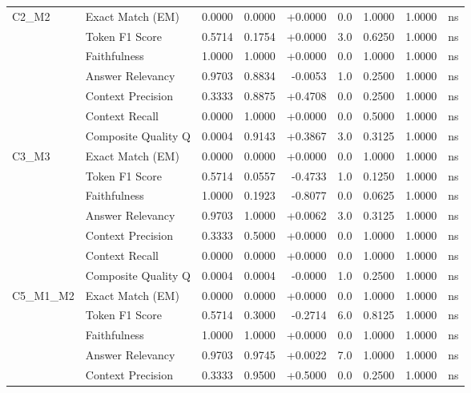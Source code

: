 \begin{table}[p]
\begin{tabular*}{\textwidth}{@{\extracolsep{\fill}} l l r r r r r r c @{}}
\addlinespace
C2\_M2          & Exact Match (EM)     & 0.0000 & 0.0000 & +0.0000 & 0.0 & 1.0000 & 1.0000 & ns \\
                & Token F1 Score       & 0.5714 & 0.1754 & +0.0000 & 3.0 & 0.6250 & 1.0000 & ns \\
                & Faithfulness         & 1.0000 & 1.0000 & +0.0000 & 0.0 & 1.0000 & 1.0000 & ns \\
                & Answer Relevancy     & 0.9703 & 0.8834 & -0.0053 & 1.0 & 0.2500 & 1.0000 & ns \\
                & Context Precision    & 0.3333 & 0.8875 & +0.4708 & 0.0 & 0.2500 & 1.0000 & ns \\
                & Context Recall       & 0.0000 & 1.0000 & +0.0000 & 0.0 & 0.5000 & 1.0000 & ns \\
                & Composite Quality Q  & 0.0004 & 0.9143 & +0.3867 & 3.0 & 0.3125 & 1.0000 & ns \\
\addlinespace
C3\_M3          & Exact Match (EM)     & 0.0000 & 0.0000 & +0.0000 & 0.0 & 1.0000 & 1.0000 & ns \\
                & Token F1 Score       & 0.5714 & 0.0557 & -0.4733 & 1.0 & 0.1250 & 1.0000 & ns \\
                & Faithfulness         & 1.0000 & 0.1923 & -0.8077 & 0.0 & 0.0625 & 1.0000 & ns \\
                & Answer Relevancy     & 0.9703 & 1.0000 & +0.0062 & 3.0 & 0.3125 & 1.0000 & ns \\
                & Context Precision    & 0.3333 & 0.5000 & +0.0000 & 0.0 & 1.0000 & 1.0000 & ns \\
                & Context Recall       & 0.0000 & 0.0000 & +0.0000 & 0.0 & 1.0000 & 1.0000 & ns \\
                & Composite Quality Q  & 0.0004 & 0.0004 & -0.0000 & 1.0 & 0.2500 & 1.0000 & ns \\
\addlinespace
C5\_M1\_M2      & Exact Match (EM)     & 0.0000 & 0.0000 & +0.0000 & 0.0 & 1.0000 & 1.0000 & ns \\
                & Token F1 Score       & 0.5714 & 0.3000 & -0.2714 & 6.0 & 0.8125 & 1.0000 & ns \\
                & Faithfulness         & 1.0000 & 1.0000 & +0.0000 & 0.0 & 1.0000 & 1.0000 & ns \\
                & Answer Relevancy     & 0.9703 & 0.9745 & +0.0022 & 7.0 & 1.0000 & 1.0000 & ns \\
                & Context Precision    & 0.3333 & 0.9500 & +0.5000 & 0.0 & 0.2500 & 1.0000 & ns \\

\end{tabular*}
\end{table}
